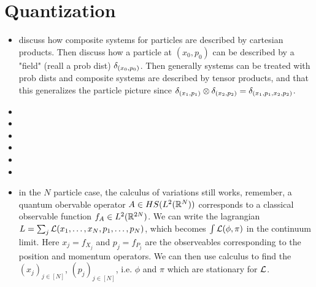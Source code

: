 \documentclass{book}
\begin{document}
	
	
	\chapter{Quantization}
	
	
	\begin{itemize}
		\item discuss how composite systems for particles are described by cartesian products. Then discuss how a particle at $(x_0,p_0)$ can be described by a "field" (reall a prob dist) $\delta_{(x_0, p_0)}$. Then generally systems can be treated with prob dists and composite systems are described by tensor products, and that this generalizes the particle picture since $\delta_{(x_1, p_1)} \otimes \delta_{(x_2, p_2)} = \delta_{(x_1, p_1, x_2, p_2)}$. 
		\item {}
		\item {}
		\item {}
		\item {}
		\item {}
		\item {}
		\item in the $N$ particle case, the calculus of variations still works, remember, a quantum obervable operator $A \in HS(L^2(\mathbb{R}^N))$ corresponds to a classical observable function $f_A \in L^2(\mathbb{R}^{2N})$. We can write the lagrangian $L = \sum_{j} \mathcal{L}(x_1, \ldots, x_N, p_1, \ldots, p_N)$, which becomes $\int \mathcal{L}(\phi, \pi)$ in the continuum limit. Here $x_j = f_{X_j}$ and $p_j = f_{P_j}$ are the observeables corresponding to the position and momentum operators. We can then use calculus to find the $(x_j)_{j \in [N]}$, $(p_j)_{j \in [N]}$, i.e. $\phi$ and $\pi$ which are stationary for $\mathcal{L}$.    

\end{itemize}
\end{document}
